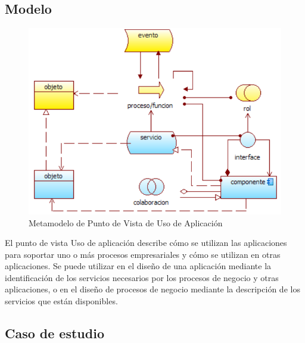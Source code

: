 \subsection{Modelo}

\begin{figure}[th!]
	\centering
	\includegraphics[width=0.5\linewidth]{arquitectura/imagenes/modeloUsoAplicacion}
	\caption{Metamodelo de Punto de Vista de Uso de Aplicación \cite{pun10}}
	\label{fig:metamodelo de punto de vista de uso de aplicación}
\end{figure}
El punto de vista Uso de aplicación describe cómo se utilizan las aplicaciones para soportar uno o más procesos empresariales y cómo se utilizan en otras aplicaciones. Se puede utilizar en el diseño de una aplicación mediante la identificación de los servicios necesarios por los procesos de negocio y otras aplicaciones, o en el diseño de procesos de negocio mediante la descripción de los servicios que están disponibles.

\subsection{Caso de estudio}

\newpage

